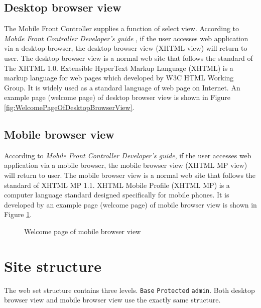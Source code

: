 \subsection{Desktop browser view}
\label{sec:WebApplication:DualView:DesktopBrowserView}

The Mobile Front Controller supplies a function of select view. According to \textit{Mobile Front Controller Developer's guide} \cite{DevelopersGuideOfMFC}, if the user accesses web application via a desktop browser, the desktop browser view (XHTML view) will return to user. The desktop browser view is a normal web site that follows the standard of The XHTML 1.0. Extensible HyperText Markup Language (XHTML\label{sym:XHTML}) is a markup language for web pages which developed by W3C HTML Working Group. It is widely used as a standard language of web page on Internet. An example page (welcome page) of desktop browser view is shown in Figure \ref{fig:WelcomePageOfDesktopBrowserView}.

\subsection{Mobile browser view}
\label{sec:WebApplication:DualView:MobileBrowserView}

According to \textit{Mobile Front Controller Developer's guide}, if the user accesses web application via a mobile browser, the mobile browser view (XHTML MP view) will return to user. The mobile browser view is a normal web site that follows the standard of XHTML MP 1.1. XHTML Mobile Profile (XHTML MP) is a computer language standard designed specifically for mobile phones. It is developed by an example page (welcome page) of mobile browser view is shown in Figure \ref{fig:WelcomePageOfMobileBrowserview}.

\begin{figure}[!hbtp]
\centering
{}
\caption{Welcome page of mobile browser view}
\label{fig:WelcomePageOfMobileBrowserview}
\end{figure} 

\section{Site structure}
\label{sec:WebApplication:SiteStructure}

The web set structure contains three levels. \texttt{Base} \textrightarrow{} \texttt{Protected} \textrightarrow{} \texttt{admin}. Both desktop browser view and mobile browser view use the exactly same structure. 

